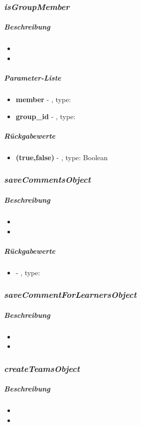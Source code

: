 \subsubsection*{\textit{isGroupMember}}\label{isGroupMemberTGUI}
\subparagraph{Beschreibung}
\begin{itemize}
	\item[] \noindent{}
	\item[]  
\end{itemize}
\subparagraph{Parameter-Liste}
\begin{itemize}
	\item[] \textbf{member} - , type: 
	\item[] \textbf{group\_id} - , type:
\end{itemize}
\subparagraph{Rückgabewerte}
\begin{itemize}
	\item[] \textbf{(true,false)} - , type: Boolean
\end{itemize}

\subsubsection*{\textit{saveCommentsObject}}\label{saveCommentsObjectTGUI}
\subparagraph{Beschreibung}
\begin{itemize}
	\item[] \noindent{}
	\item[]  
\end{itemize}
\subparagraph{Rückgabewerte}
\begin{itemize}
	\item[] \textbf{} - , type: 
\end{itemize}

\subsubsection*{\textit{saveCommentForLearnersObject}}\label{saveCommentForLearnersObjectTGUI}
\subparagraph{Beschreibung}
\begin{itemize}
	\item[] \noindent{}
	\item[]  
\end{itemize}

\subsubsection*{\textit{createTeamsObject}}\label{createTeamsObjectTGUI}
\subparagraph{Beschreibung}
\begin{itemize}
	\item[] \noindent{}
	\item[]  
\end{itemize}

